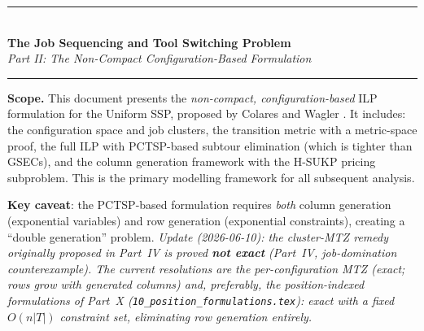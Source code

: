 \documentclass[11pt,a4paper]{article}
\theoremstyle{plain}
\theoremstyle{definition}
\begin{document}

\begin{center}
  {\color{navyblue}\rule{\textwidth}{2pt}}\\[0.4cm]
  {\LARGE\bfseries\color{navyblue}The Job Sequencing and Tool Switching Problem}\\[0.3cm]
  {\large\itshape\color{midblue}Part II: The Non-Compact Configuration-Based Formulation}\\[0.2cm]
  {\color{navyblue}\rule{\textwidth}{2pt}}
\end{center}

\begin{mdframed}[backgroundcolor=lightblue,linecolor=navyblue,linewidth=1pt,
  innerleftmargin=14pt,innerrightmargin=14pt,innertopmargin=8pt,innerbottommargin=8pt]
\small\textbf{Scope.}
This document presents the \emph{non-compact, configuration-based} ILP formulation
for the Uniform SSP, proposed by Colares and Wagler \cite{Colares2026Exact}.
It includes: the configuration space and job clusters, the transition metric with
a metric-space proof, the full ILP with PCTSP-based subtour elimination (which is
tighter than GSECs), and the column generation framework with the H-SUKP pricing
subproblem. This is the primary modelling framework for all subsequent analysis.

\smallskip
\textbf{Key caveat}: the PCTSP-based formulation requires \emph{both} column
generation (exponential variables) and row generation (exponential constraints),
creating a ``double generation'' problem.
\emph{Update (2026-06-10): the cluster-MTZ remedy originally proposed in Part~IV is
proved \textbf{not exact} (Part~IV, job-domination counterexample). The current
resolutions are the per-configuration MTZ (exact; rows grow with generated columns)
and, preferably, the position-indexed formulations of Part~X
(\texttt{10\_position\_formulations.tex}): exact with a \emph{fixed} $O(n|T|)$
constraint set, eliminating row generation entirely.}
\end{mdframed}

\vspace{0.5cm}
\tableofcontents
\newpage
\end{document}
